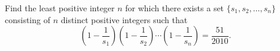Find the least positive integer $n$ for which there exists a set $\{s_1, s_2, \ldots , s_n\}$ consisting of $n$ distinct positive integers such that\[ \left( 1 - \frac{1}{s_1} \right) \left( 1 - \frac{1}{s_2} \right) \cdots \left( 1 - \frac{1}{s_n} \right) = \frac{51}{2010}.\]